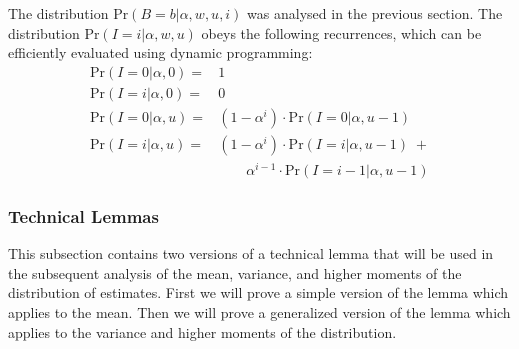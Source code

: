 \documentclass{sig-alternate}
\begin{document}
The distribution $\mathrm{Pr}(B\!=\!b | \alpha, w, u, i)$ was analysed in the previous section. 
The distribution $\mathrm{Pr}(I\!=\!i | \alpha, w, u)$ obeys the following recurrences, which can be efficiently
evaluated using dynamic programming:
\begin{align}
\mathrm{Pr}(I \!=\! 0 | \alpha, 0) = & 1 \\
\mathrm{Pr}(I \!=\! i | \alpha,  0) = & 0 \\
\mathrm{Pr}(I \!=\! 0 | \alpha, u) = & (1 - \alpha^i) \cdot \mathrm{Pr}(I \!=\! 0 | \alpha, u\!-\!1) \\
\mathrm{Pr}(I \!=\! i | \alpha,  u) = & (1 - \alpha^i) \cdot \mathrm{Pr}(I \!=\! i | \alpha, u\!-\!1) \; + \\
                                        & \quad \quad  \alpha^{i\!-\!1} \cdot \mathrm{Pr}(I \!=\! i\!-\!1 | \alpha, u\!-\!1) 
\end{align}


\subsubsection{Technical Lemmas}

This subsection contains two versions of a technical lemma that will be used in the subsequent
analysis of the mean, variance, and higher moments of the distribution of estimates.
First we will prove a simple version of the lemma which applies to the mean.
Then we will prove a generalized version of the lemma which applies to the variance
and higher moments of the distribution.
\end{document}
